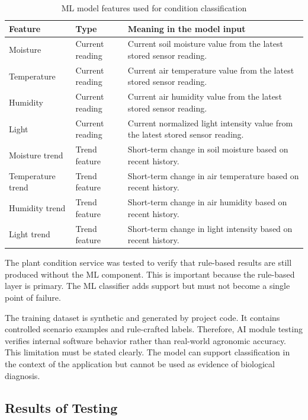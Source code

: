 \begin{table}[H]
\centering
\caption{ML model features used for condition classification}
\label{tab:ml-model-features}
\begin{tabular}{p{}p{}p{}}
\hline
\textbf{Feature} & \textbf{Type} & \textbf{Meaning in the model input} \\
\hline
Moisture & Current reading & Current soil moisture value from the latest stored sensor reading. \\
Temperature & Current reading & Current air temperature value from the latest stored sensor reading. \\
Humidity & Current reading & Current air humidity value from the latest stored sensor reading. \\
Light & Current reading & Current normalized light intensity value from the latest stored sensor reading. \\
Moisture trend & Trend feature & Short-term change in soil moisture based on recent history. \\
Temperature trend & Trend feature & Short-term change in air temperature based on recent history. \\
Humidity trend & Trend feature & Short-term change in air humidity based on recent history. \\
Light trend & Trend feature & Short-term change in light intensity based on recent history. \\
\hline
\end{tabular}
\end{table}

The plant condition service was tested to verify that rule-based results are still produced without the ML component. This is important because the rule-based layer is primary. The ML classifier adds support but must not become a single point of failure.

The training dataset is synthetic and generated by project code. It contains controlled scenario examples and rule-crafted labels. Therefore, AI module testing verifies internal software behavior rather than real-world agronomic accuracy. This limitation must be stated clearly. The model can support classification in the context of the application but cannot be used as evidence of biological diagnosis.

\subsection{Results of Testing}
\label{subsec:results-of-testing}

